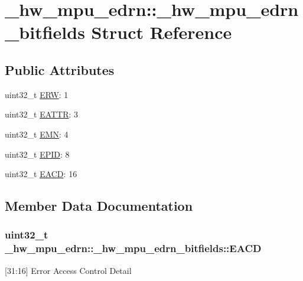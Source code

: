 \hypertarget{struct__hw__mpu__edrn_1_1__hw__mpu__edrn__bitfields}{}\section{\+\_\+hw\+\_\+mpu\+\_\+edrn\+:\+:\+\_\+hw\+\_\+mpu\+\_\+edrn\+\_\+bitfields Struct Reference}
\label{struct__hw__mpu__edrn_1_1__hw__mpu__edrn__bitfields}
\subsection*{Public Attributes}
\begin{DoxyCompactItemize}
\item 
uint32\+\_\+t \hyperlink{struct__hw__mpu__edrn_1_1__hw__mpu__edrn__bitfields_a0545dc57014eba717ed10b6501a93c0e}{E\+RW}\+: 1
\item 
uint32\+\_\+t \hyperlink{struct__hw__mpu__edrn_1_1__hw__mpu__edrn__bitfields_a48d46944111e5581d33bd1dc7ea2ba05}{E\+A\+T\+TR}\+: 3
\item 
uint32\+\_\+t \hyperlink{struct__hw__mpu__edrn_1_1__hw__mpu__edrn__bitfields_a369d29a46030e7d889783cc710eee01c}{E\+MN}\+: 4
\item 
uint32\+\_\+t \hyperlink{struct__hw__mpu__edrn_1_1__hw__mpu__edrn__bitfields_aa97860a45d49f7aaa7ec8db57a5c1711}{E\+P\+ID}\+: 8
\item 
uint32\+\_\+t \hyperlink{struct__hw__mpu__edrn_1_1__hw__mpu__edrn__bitfields_a03f7a5c2bbaae52b02dfebf933e01bde}{E\+A\+CD}\+: 16
\end{DoxyCompactItemize}


\subsection{Member Data Documentation}
\subsubsection[{\texorpdfstring{E\+A\+CD}{EACD}}]{\setlength{\rightskip}{0pt plus 5cm}uint32\+\_\+t \+\_\+hw\+\_\+mpu\+\_\+edrn\+::\+\_\+hw\+\_\+mpu\+\_\+edrn\+\_\+bitfields\+::\+E\+A\+CD}\hypertarget{struct__hw__mpu__edrn_1_1__hw__mpu__edrn__bitfields_a03f7a5c2bbaae52b02dfebf933e01bde}{}\label{struct__hw__mpu__edrn_1_1__hw__mpu__edrn__bitfields_a03f7a5c2bbaae52b02dfebf933e01bde}
\mbox{[}31\+:16\mbox{]} Error Access Control Detail 
